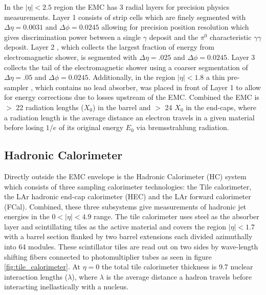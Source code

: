 In the $|\eta| < 2.5$ region the EMC has 3 radial layers for precision physics
measurements.  Layer 1 consists of strip cells which are finely segmented with
$\Delta\eta = 0.0031$ and $\Delta\phi = 0.0245$ allowing for precision position
resolution which gives discrimination power between a single $\gamma$ deposit
and the $\pi^0$ characteristic $\gamma\gamma$ deposit. Layer 2 , which collects
the largest fraction of energy from electromagnetic shower, is segmented with
$\Delta\eta = .025$ and $\Delta\phi = 0.0245$. Layer 3 collects the tail of the
electromagnetic shower using a coarser segmentation of $\Delta\eta = .05$ and
$\Delta\phi = 0.0245$.  Additionally, in the region $|\eta| < 1.8$ a thin
pre-sampler , which contains no lead absorber, was placed in front of Layer 1 to
allow for energy corrections due to losses upstream of the EMC.  Combined the
EMC is $>$ 22 radiation lengths ($X_0$) in the barrel and $>$ 24 $X_0$ in the
end-caps, where a radiation length is the average distance an electron travels
in a given material before losing $1/e$ of its original energy $E_0$ via
bremsstrahlung radiation.

\subsection{Hadronic Calorimeter}

Directly outside the EMC envelope is the Hadronic Calorimeter (HC) system
\cite{PERF-2007-01} which consists of three sampling calorimeter technologies:
the Tile calorimeter, the LAr hadronic end-cap calorimeter (HEC) and the LAr
forward calorimeter (FCal).  Combined, these three subsystems give measurements
of hadronic jet energies in the $0 <|\eta| < 4.9$ range. The tile calorimeter
uses steel as the absorber layer and scintillating tiles as the active material
and covers the region $|\eta| < 1.7$ with a barrel section flanked by two barrel
extensions each divided azimuthally into 64 modules.  These scintillator tiles
are read out on two sides by wave-length shifting fibers connected to
photomultiplier tubes as seen in figure \ref{fig:tile_calorimeter}. At $\eta =
0$ the total tile calorimeter thickness is 9.7 nuclear interaction lengths
($\lambda$), where $\lambda$ is the average distance a hadron travels before
interacting inellastically with a nucleus.


